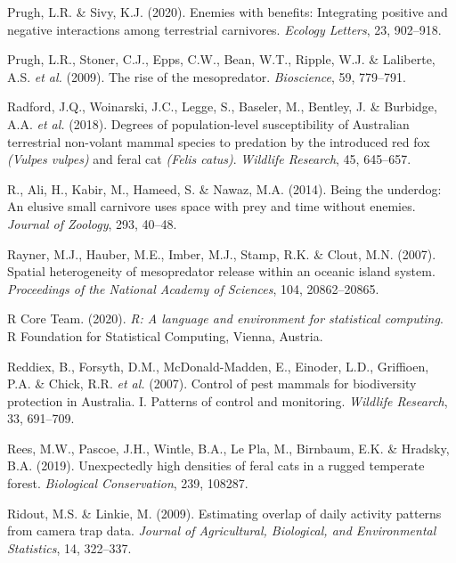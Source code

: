 \documentclass[11pt,a4paper,titlepage,twoside,openright]{style/unimelbthesis}
\begin{document}
\begin{mainmatter}
\leavevmode\hypertarget{ref-prugh2020enemies}{}%
Prugh, L.R. \& Sivy, K.J. (2020). Enemies with benefits: Integrating positive and negative interactions among terrestrial carnivores. \emph{Ecology Letters}, 23, 902--918.

\leavevmode\hypertarget{ref-prugh2009rise}{}%
Prugh, L.R., Stoner, C.J., Epps, C.W., Bean, W.T., Ripple, W.J. \& Laliberte, A.S. \emph{et al.} (2009). The rise of the mesopredator. \emph{Bioscience}, 59, 779--791.

\leavevmode\hypertarget{ref-radford2018degrees}{}%
Radford, J.Q., Woinarski, J.C., Legge, S., Baseler, M., Bentley, J. \& Burbidge, A.A. \emph{et al.} (2018). Degrees of population-level susceptibility of Australian terrestrial non-volant mammal species to predation by the introduced red fox \emph{(Vulpes vulpes)} and feral cat \emph{(Felis catus)}. \emph{Wildlife Research}, 45, 645--657.

\leavevmode\hypertarget{ref-bischof2014being}{}%
R., Ali, H., Kabir, M., Hameed, S. \& Nawaz, M.A. (2014). Being the underdog: An elusive small carnivore uses space with prey and time without enemies. \emph{Journal of Zoology}, 293, 40--48.

\leavevmode\hypertarget{ref-rayner2007spatial}{}%
Rayner, M.J., Hauber, M.E., Imber, M.J., Stamp, R.K. \& Clout, M.N. (2007). Spatial heterogeneity of mesopredator release within an oceanic island system. \emph{Proceedings of the National Academy of Sciences}, 104, 20862--20865.

\leavevmode\hypertarget{ref-R}{}%
R Core Team. (2020). \emph{R: A language and environment for statistical computing}. R Foundation for Statistical Computing, Vienna, Austria.

\leavevmode\hypertarget{ref-reddiex2007control}{}%
Reddiex, B., Forsyth, D.M., McDonald-Madden, E., Einoder, L.D., Griffioen, P.A. \& Chick, R.R. \emph{et al.} (2007). Control of pest mammals for biodiversity protection in Australia. I. Patterns of control and monitoring. \emph{Wildlife Research}, 33, 691--709.

\leavevmode\hypertarget{ref-rees2019unexpectedly}{}%
Rees, M.W., Pascoe, J.H., Wintle, B.A., Le Pla, M., Birnbaum, E.K. \& Hradsky, B.A. (2019). Unexpectedly high densities of feral cats in a rugged temperate forest. \emph{Biological Conservation}, 239, 108287.

\leavevmode\hypertarget{ref-ridout2009estimating}{}%
Ridout, M.S. \& Linkie, M. (2009). Estimating overlap of daily activity patterns from camera trap data. \emph{Journal of Agricultural, Biological, and Environmental Statistics}, 14, 322--337.


\end{mainmatter}
\end{document}
